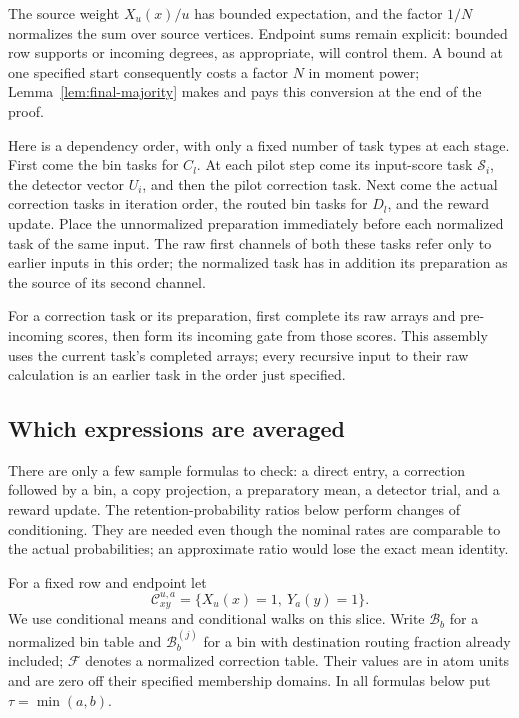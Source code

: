 The source weight $X_u(x)/u$ has bounded expectation, and the factor
$1/N$ normalizes the sum over source vertices.  Endpoint sums remain
explicit: bounded row supports or incoming degrees, as appropriate,
will control them.  A bound at one specified start consequently costs
a factor $N$ in moment power; Lemma~\ref{lem:final-majority} makes and
pays this conversion at the end of the proof.

Here is a dependency order, with only a fixed number of task types at each
stage.  First come the bin tasks for $C_l$.  At each pilot step come its
input-score task $\mathcal S_i$, the detector vector $U_i$, and then the
pilot correction task.  Next come the actual correction tasks in iteration
order, the routed bin tasks for $D_l$, and the reward update.  Place the
unnormalized preparation immediately before each normalized task of the
same input.  The raw first channels of both these tasks refer only to
earlier inputs in this order; the normalized task has in addition its
preparation as the source of its second channel.

For a correction task or its preparation, first complete its raw arrays
and pre-incoming scores, then form its incoming gate from those scores.
This assembly uses the current task's completed arrays; every recursive
input to their raw calculation is an earlier task in the order just
specified.

\subsection{Which expressions are averaged}

There are only a few sample formulas to check: a direct entry, a correction followed by a bin, a copy projection, a preparatory mean, a detector trial, and a reward update. The retention-probability ratios below perform changes of conditioning. They are needed even though the nominal rates are comparable to the actual probabilities; an approximate ratio would lose the exact mean identity.

For a fixed row and endpoint let
\[
 \mathcal C_{xy}^{u,a}=\{X_u(x)=1,\ Y_a(y)=1\}.
\]
We use conditional means and conditional walks on this slice.  Write
$\mathcal B_b$ for a normalized bin table and $\mathcal B_b^{(j)}$ for a
bin with destination routing fraction already included; $\mathcal F$
denotes a normalized correction table.  Their values are in atom units
and are zero off their specified membership domains.  In all formulas
below put $\tau=\min(a,b)$.

